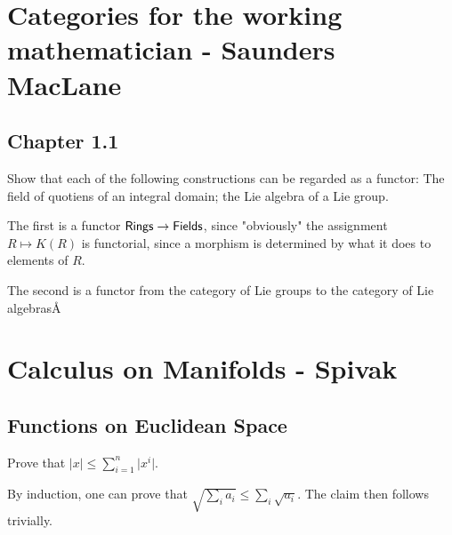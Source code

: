 \documentclass[11pt, english]{article}
\begin{document}
\section{Categories for the working mathematician - Saunders MacLane}
\subsection{Chapter 1.1}

\begin{exc}[1.1]
Show that each of the following constructions can be regarded as a functor: The field of quotiens of an integral domain; the Lie algebra of a Lie group.
\end{exc}
\begin{sol}
The first is a functor $\mathsf{Rings} \to \mathsf{Fields}$, since "obviously" the assignment $R \mapsto K(R)$ is functorial, since a morphism is determined by what it does to elements of $R$.

The second is a functor from the category of Lie groups to the category of Lie algebrasÅ
\end{sol}




\section{Calculus on Manifolds - Spivak}

\subsection{Functions on Euclidean Space}

\begin{exc}[Exercise 1.1]
Prove that $\lvert x \rvert \leq \sum_{i=1}^n \lvert x^i  \rvert$.  
\end{exc}
\begin{sol}
 By induction, one can prove that $\sqrt{\sum_i a_i} \leq \sum_i \sqrt{a_i}$. The claim then follows trivially.
\end{sol}
\end{document}
